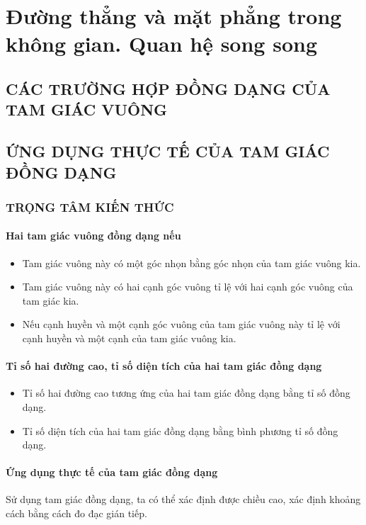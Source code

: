 \chapter{Đường thẳng và mặt phẳng trong không gian. Quan hệ song song}
\section{CÁC TRƯỜNG HỢP ĐỒNG DẠNG CỦA TAM GIÁC VUÔNG}
\section{ỨNG DỤNG THỰC TẾ CỦA TAM GIÁC ĐỒNG DẠNG}
\subsection{TRỌNG TÂM KIẾN THỨC}
\subsubsection{Hai tam giác vuông đồng dạng nếu}
\begin{itemize}
	\item Tam giác vuông này có một góc nhọn bằng góc nhọn của tam giác vuông kia.
	\item Tam giác vuông này có hai cạnh góc vuông tỉ lệ với hai cạnh góc vuông của tam giác kia.
	\item Nếu cạnh huyền và một cạnh góc vuông của tam giác vuông này tỉ lệ với cạnh huyền và một cạnh của  tam giác vuông kia.
\end{itemize}
\subsubsection{Tỉ số hai đường cao, tỉ số diện tích của hai tam giác đồng dạng}

\begin{itemize}
	\item Tỉ số hai đường cao tương ứng của hai tam giác đồng dạng bằng tỉ số đồng dạng.
	\item Tỉ số diện tích của hai tam giác đồng dạng bằng bình phương tỉ số đồng dạng.
\end{itemize}
\subsubsection{Ứng dụng thực tế của tam giác đồng dạng}
Sử dụng tam giác đồng dạng, ta có thể xác định được chiều cao, xác định khoảng cách bằng cách đo đạc gián tiếp.

